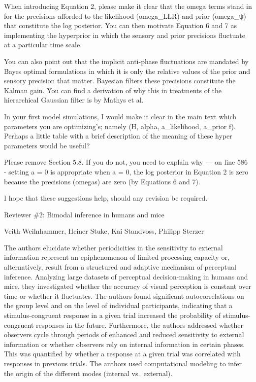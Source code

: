 \documentclass[
]{article}
\begin{document}
When introducing Equation 2, please make it clear that the omega terms
stand in for the precisions afforded to the likelihood (omega\_LLR) and
prior (omega\_ψ) that constitute the log posterior. You can then
motivate Equation 6 and 7 as implementing the hyperprior in which the
sensory and prior precisions fluctuate at a particular time scale.

You can also point out that the implicit anti-phase fluctuations are
mandated by Bayes optimal formulations in which it is only the relative
values of the prior and sensory precision that matter. Bayesian filters
these precisions constitute the Kalman gain. You can find a derivation
of why this in treatments of the hierarchical Gaussian filter is by
Mathys et al.

In your first model simulations, I would make it clear in the main text
which parameters you are optimizing's; namely (H, alpha, a\_likelihood,
a\_prior f). Perhaps a little table with a brief description of the
meaning of these hyper parameters would be useful?

Please remove Section 5.8. If you do not, you need to explain why --- on
line 586 - setting a = 0 is appropriate when a = 0, the log posterior in
Equation 2 is zero because the precisions (omegas) are zero (by
Equations 6 and 7).

I hope that these suggestions help, should any revision be required.

Reviewer \#2: Bimodal inference in humans and mice

Veith Weilnhammer, Heiner Stuke, Kai Standvoss, Philipp Sterzer

The authors elucidate whether periodicities in the sensitivity to
external information represent an epiphenomenon of limited processing
capacity or, alternatively, result from a structured and adaptive
mechanism of perceptual inference. Analyzing large datasets of
perceptual decision-making in humans and mice, they investigated whether
the accuracy of visual perception is constant over time or whether it
fluctuates. The authors found significant autocorrelations on the group
level and on the level of individual participants, indicating that a
stimulus-congruent response in a given trial increased the probability
of stimulus-congruent responses in the future. Furthermore, the authors
addressed whether observers cycle through periods of enhanced and
reduced sensitivity to external information or whether observers rely on
internal information in certain phases. This was quantified by whether a
response at a given trial was correlated with responses in previous
trials. The authors used computational modeling to infer the origin of
the different modes (internal vs.~external).
\end{document}
